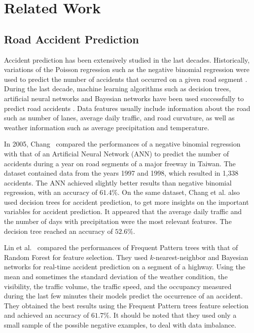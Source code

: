 \documentclass[conference]{IEEEtran}
\begin{document}
\section{Related Work}
\label{sec:relatedwork}
\subsection{Road Accident Prediction}
Accident prediction has been extensively studied in the last decades.
Historically, variations of the Poisson regression such as the negative
binomial regression were used to predict the number of accidents that
occurred on a given road segment \cite{Milton1998}. During the last decade,
machine learning algorithms such as decision trees, artificial neural networks
and Bayesian networks have been used successfully to predict road accidents
\cite{Chang2005, Chang2005b, Lin2015, Theofilatos2017}.
Data features usually include information about the road such as number of
lanes, average daily traffic, and road curvature, as well as weather
information such as average precipitation and temperature. 

In 2005,
Chang~\cite{Chang2005} compared the performances of a negative binomial
regression with that of an Artificial Neural Network (ANN) to predict the number
of accidents during a year on road segments of a major freeway in
Taiwan. The dataset contained data from the years 1997 and 1998, which
resulted in 1,338 accidents. The ANN achieved slightly better results than negative 
binomial regression, with
an accuracy of $61.4\%$. On the same dataset, Chang et
al.\cite{Chang2005b} also used decision trees for accident prediction,
 to get more insights on the important variables for accident
prediction. It appeared that the average daily traffic and the number of
days with precipitation were the most relevant features. The decision tree
reached an accuracy of $52.6\%$. 

Lin et
al.~\cite{Lin2015} compared the performances of Frequent Pattern trees\cite{Han2004} with
that of Random Forest for feature selection. They used $k$-nearest-neighbor
and Bayesian networks for real-time accident prediction on a segment of
a highway. Using the mean and sometimes the standard deviation of the weather condition, the visibility, the traffic volume, the traffic speed, and the occupancy measured during the last few minutes their models predict the occurrence of an accident. They obtained
the best results using the Frequent Pattern trees feature selection and achieved
an accuracy of $61.7\%$. It should be noted that they used only a small sample of the
possible negative examples, to deal with data imbalance. 
\end{document}
